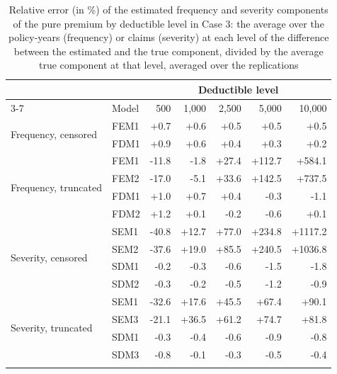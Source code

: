 \documentclass[11pt]{article}
\begin{document}
\begin{table}[!ht]
\footnotesize
\centering
{\color{blue}
\begin{tabular}{llrrrrr}
\toprule
 & & \multicolumn{5}{c}{Deductible level} \\
\cmidrule(lr){3-7}
 & Model &    500 &  1,000 &  2,500 &  5,000 & 10,000 \\
\midrule
\multirow{2}{*}{Frequency, censored} & FEM1 & +0.7 & +0.6 & +0.5 & +0.5 & +0.5 \\
 & FDM1 & +0.9 & +0.6 & +0.4 & +0.3 & +0.2 \\
\midrule
\multirow{4}{*}{Frequency, truncated} & FEM1 & -11.8 & -1.8 & +27.4 & +112.7 & +584.1 \\
 & FEM2 & -17.0 & -5.1 & +33.6 & +142.5 & +737.5 \\
 & FDM1 & +1.0 & +0.7 & +0.4 & -0.3 & -1.1 \\
 & FDM2 & +1.2 & +0.1 & -0.2 & -0.6 & +0.1 \\
\midrule
\multirow{4}{*}{Severity, censored} & SEM1 & -40.8 & +12.7 & +77.0 & +234.8 & +1117.2 \\
 & SEM2 & -37.6 & +19.0 & +85.5 & +240.5 & +1036.8 \\
 & SDM1 & -0.2 & -0.3 & -0.6 & -1.5 & -1.8 \\
 & SDM2 & -0.3 & -0.2 & -0.5 & -1.2 & -0.9 \\
\midrule
\multirow{4}{*}{Severity, truncated} & SEM1 & -32.6 & +17.6 & +45.5 & +67.4 & +90.1 \\
 & SEM3 & -21.1 & +36.5 & +61.2 & +74.7 & +81.8 \\
 & SDM1 & -0.3 & -0.4 & -0.6 & -0.9 & -0.8 \\
 & SDM3 & -0.8 & -0.1 & -0.3 & -0.5 & -0.4 \\
\hhline{=======}
\end{tabular}
}
\caption{Relative error (in \%) of the estimated frequency and severity components of the pure premium by deductible level in Case 3: the average over the policy-years (frequency) or claims (severity) at each level of the difference between the estimated and the true component, divided by the average true component at that level, averaged over the replications}\label{tab:bylevel3}
\end{table}
\end{document}
